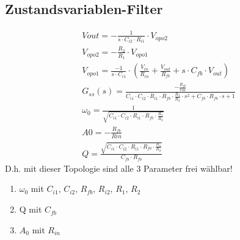 \subsection{Zustandsvariablen-Filter}
\begin{gather*}
V{out}=-\frac{1}{s\cdot C_{i2}\cdot R_{i1}}\cdot V_{opo2}\\
V_{opo2}=-\frac{R_2}{R_1}\cdot V_{opo1}\\
V_{opo1}=\frac{-1}{s\cdot C_{i1}}\cdot (\frac{V_{in}}{R_{in}}+\frac{V_{out}}{R_{fb}}+s\cdot C_{fb}\cdot V_{out})\\
G_{ss}(s)=\frac{-\frac{R_{fb}}{rin}}{C_{i1}\cdot C_{i2}\cdot R_{i1}\cdot R_{fb}\cdot \frac{R_1}{R_2}\cdot s^2+C_{fb}\cdot R_{fb}\cdot s+1}\\
\omega_{0}=\frac{1}{\sqrt{C_{i1}\cdot C_{i2}\cdot R_{i1}\cdot R_{fb}\cdot \frac{R_1}{R_2}}}\\
A0=-\frac{R_{fb}}{Rin}\\
Q=\frac{\sqrt{C_{i1}\cdot C_{i2}\cdot R_{i1}\cdot R_{fb}\cdot \frac{R_1}{R_2}}}{C_{fb}\cdot R_{fb}}
\end{gather*}
D.h. mit dieser Topologie sind alle 3 Parameter frei wählbar!
\begin{enumerate}
  \item $\omega_{0}$ mit $C_{i1}$, $C_{i2}$, $R_{fb}$, $R_{i2}$, $R_1$, $R_2$
  \item Q mit $C_{fb}$
  \item $A_0$ mit $R_{in}$
\end{enumerate}


